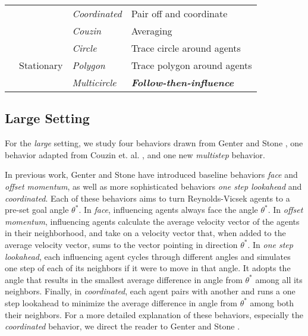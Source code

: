 \begin{table}[]
\begin{tabular}{|l|l|l|l|}
                       &                             & \textit{Coordinated}      & Pair off and coordinate      \\ \cline{3-4}
                       &                             & \textit{Couzin}      & Averaging       \\ \cline{2-4}
                       & \multirow{3}{*}{Stationary} & \textit{Circle}      & Trace circle around agents              \\ \cline{3-4}
                       &                             & \textit{Polygon}     & Trace polygon around agents             \\ \cline{3-4}
                       &                             & \textit{Multicircle} & \textit{\textbf{Follow-then-influence}} \\ \hline
\end{tabular}
\end{table}

\subsection{Large Setting}

For the \textit{large} setting, we study four behaviors drawn from Genter and
Stone \cite{genter201612steplookahead,genter2016facegoalfacecurrent,
genter2015placement}, one behavior adapted from Couzin et. al.
\cite{couzin2005}, and one new \textit{multistep} behavior.

In previous work, Genter and Stone have introduced baseline behaviors
\textit{face} and \textit{offset momentum}, as well as more sophisticated
behaviors \textit{one step lookahead} and \textit{coordinated}.
Each of these behaviors aims to turn Reynolds-Vicsek agents to a pre-set goal
angle $\theta^*$.
In \textit{face}, influencing agents always face the angle $\theta^*$.
In \textit{offset momentum}, influencing agents calculate the average velocity
vector of the agents in their neighborhood, and take on a velocity vector that,
when added to the average velocity vector, sums to the vector pointing in
direction $\theta^*$.
In \textit{one step lookahead}, each influencing agent cycles through different
angles and simulates one step of each of its neighbors if it were to move in
that angle.
It adopts the angle that results in the smallest average difference in angle
from $\theta^*$ among all its neighbors.
Finally, in \textit{coordinated}, each agent pairs with another and runs a one
step lookahead to minimize the average difference in angle from $\theta^*$
among both their neighbors.
For a more detailed explanation of these behaviors, especially the
\textit{coordinated} behavior, we direct the reader to Genter and Stone
\cite{genter201612steplookahead}.

